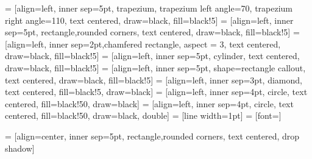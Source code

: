 \usetikzlibrary {intersections,through,arrows.meta,graphs,shapes.misc,positioning,shapes.misc,positioning,calc}
\usetikzlibrary{animations}
\usetikzlibrary {shapes.geometric}
\usetikzlibrary {animations}
\usetikzlibrary {shapes.multipart}
\usetikzlibrary {positioning}
\usetikzlibrary {fit,shapes.geometric}
\usetikzlibrary {automata}
\usetikzlibrary {quotes}
\usetikzlibrary {matrix}
\usetikzlibrary {backgrounds}
\usetikzlibrary {scopes}
\usetikzlibrary {calc}
\usetikzlibrary {intersections}
\usetikzlibrary {svg.path}
\usetikzlibrary {decorations}
\usetikzlibrary {patterns}
\usetikzlibrary {decorations.pathmorphing}
\usetikzlibrary {shadows}
\usetikzlibrary {bending}

 = [align=left, inner sep=5pt, trapezium, trapezium left angle=70, trapezium right angle=110, text centered, draw=black, fill=black!5]
 = [align=left, inner sep=5pt, rectangle,rounded corners, text centered, draw=black, fill=black!5]
 = [align=left, inner sep=2pt,chamfered rectangle, aspect = 3, text centered, draw=black, fill=black!5]
 = [align=left, inner sep=5pt, cylinder, text centered, draw=black, fill=black!5]
 = [align=left, inner sep=5pt, shape=rectangle callout, text centered, draw=black, fill=black!5]
 = [align=left, inner sep=3pt, diamond, text centered, fill=black!5, draw=black]
 = [align=left, inner sep=4pt, circle, text centered, fill=black!50, draw=black]
 = [align=left, inner sep=4pt, circle, text centered, fill=black!50, draw=black, double]
 = [line width=1pt]
 = [font=\normalsize]

 = [align=center, inner sep=5pt, rectangle,rounded corners, text centered, drop shadow]